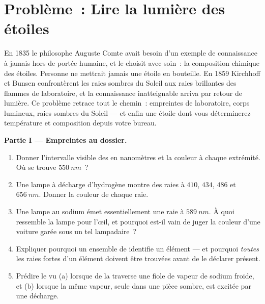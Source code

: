 \section{Problème~: Lire la lumière des étoiles}

\begin{problem}
\label{pb:g10:light-spectra:1}
En 1835 le philosophe Auguste Comte avait besoin d'un exemple de
connaissance à jamais hors de portée humaine, et le choisit avec soin~:
la composition chimique des étoiles. Personne ne mettrait jamais une
étoile en bouteille. En 1859 Kirchhoff et Bunsen confrontèrent les
raies sombres du Soleil aux raies brillantes des flammes de laboratoire,
et la connaissance inatteignable arriva par retour de lumière. Ce
problème retrace tout le chemin~: empreintes de laboratoire, corps
lumineux, raies sombres du Soleil --- et enfin une étoile dont vous
déterminerez température et composition depuis votre bureau.

\medskip
\noindent\textbf{Partie I --- Empreintes au dossier.}
\begin{enumerate}
  \item Donner l'intervalle visible des  en
        nanomètres et la couleur à chaque extrémité. Où se trouve
        $\qty{550}{nm}$~?
  \item Une lampe à décharge d'hydrogène montre des raies à $410$,
        $434$, $486$ et $\qty{656}{nm}$. Donner la couleur de chaque
        raie.
  \item Une lampe au sodium émet essentiellement une raie à
        $\qty{589}{nm}$. À quoi ressemble la lampe pour l'œil, et
        pourquoi est-il vain de juger la couleur d'une voiture garée
        sous un tel lampadaire~?
  \item Expliquer pourquoi un ensemble de 
        identifie un élément --- et pourquoi \emph{toutes} les raies
        fortes d'un élément doivent être trouvées avant de le déclarer
        présent.
  \item Prédire le  vu (a) lorsque de la 
        traverse une fiole de vapeur de sodium froide, et (b) lorsque
        la même vapeur, seule dans une pièce sombre, est excitée par
        une décharge.
\end{enumerate}


\end{problem}
